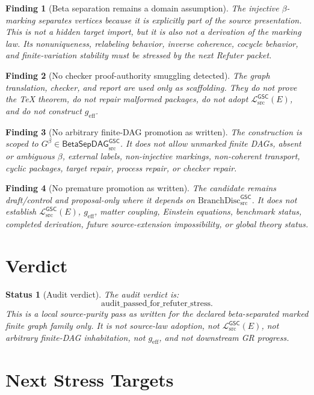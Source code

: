 \documentclass[11pt]{article}
\newcommand{\MetricData}{\mathcal{L}_{\mathrm{src}}^{\mathsf{GSC}}}
\newcommand{\geff}{g_{\mathrm{eff}}}
\newcommand{\BranchDisc}{\mathrm{BranchDisc}_{\mathrm{src}}^{\mathsf{GSC}}}
\newcommand{\BetaGraph}{\mathsf{BetaSepDAG}_{\mathrm{src}}^{\mathsf{GSC}}}
\newtheorem{finding}{Finding}
\newtheorem{status}{Status}
\begin{document}
\begin{finding}[Beta separation remains a domain assumption]
The injective \(\beta\)-marking separates vertices because it is explicitly
part of the source presentation. This is not a hidden target import, but it is
also not a derivation of the marking law. Its nonuniqueness, relabeling
behavior, inverse coherence, cocycle behavior, and finite-variation stability
must be stressed by the next Refuter packet.
\end{finding}

\begin{finding}[No checker proof-authority smuggling detected]
The graph translation, checker, and report are used only as scaffolding. They
do not prove the TeX theorem, do not repair malformed packages, do not adopt
\(\MetricData(E)\), and do not construct \(\geff\).
\end{finding}

\begin{finding}[No arbitrary finite-DAG promotion as written]
The construction is scoped to \(G^\beta\in\BetaGraph\). It does not allow
unmarked finite DAGs, absent or ambiguous \(\beta\), external labels,
non-injective markings, non-coherent transport, cyclic packages, target
repair, process repair, or checker repair.
\end{finding}

\begin{finding}[No premature promotion as written]
The candidate remains draft/control and proposal-only where it depends on
\(\BranchDisc\). It does not establish \(\MetricData(E)\), \(\geff\), matter
coupling, Einstein equations, benchmark status, completed derivation, future
source-extension impossibility, or global theory status.
\end{finding}

\section{Verdict}

\begin{status}[Audit verdict]
The audit verdict is:
\[
  \mathrm{audit\_passed\_for\_refuter\_stress}.
\]
This is a local source-purity pass as written for the declared
beta-separated marked finite graph family only. It is not source-law adoption,
not \(\MetricData(E)\), not arbitrary finite-DAG inhabitation, not \(\geff\),
and not downstream GR progress.
\end{status}

\section{Next Stress Targets}
\end{document}
